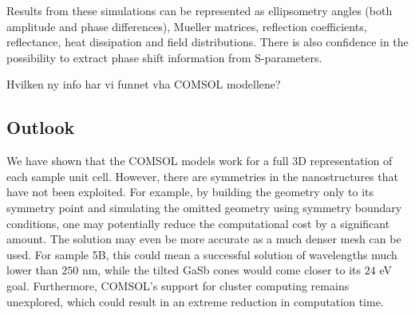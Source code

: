 Results from these simulations can be represented as ellipsometry angles (both amplitude and phase differences), Mueller matrices, reflection coefficients, reflectance, heat dissipation and field distributions. There is also confidence in the possibility to extract phase shift information from S-parameters.%

Hvilken ny info har vi funnet vha COMSOL modellene?

\subsection*{Outlook}

We have shown that the COMSOL models work for a full 3D representation of each sample unit cell. However, there are symmetries in the nanostructures that have not been exploited. For example, by building the geometry only to its symmetry point and simulating the omitted geometry using symmetry boundary conditions, one may potentially reduce the computational cost by a significant amount. The solution may even be more accurate as a much denser mesh can be used. For sample 5B, this could mean a successful solution of wavelengths much lower than $250$ nm, while the tilted GaSb cones would come closer to its $24$ eV goal. Furthermore, COMSOL's support for cluster computing remains unexplored, which could result in an extreme reduction in computation time. %



\cleardoublepage